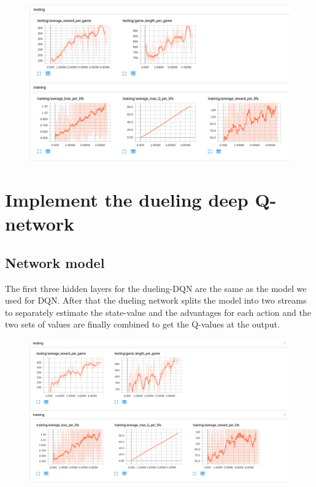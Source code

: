 \documentclass{article}
\begin{document}
\begin{figure}[h]
\centering
\includegraphics[scale=0.3]{double.png}
\end{figure}

\section*{Implement the dueling deep Q-network}
\subsection*{Network model}
The first three hidden layers for the dueling-DQN are the same as the model we used for DQN. After that the dueling network splits the model into two streams to separately estimate the state-value and the advantages for each action and the two sets of values are finally combined to get the Q-values at the output.

\begin{figure}[h]
\centering
\includegraphics[scale=0.3]{duel.png}
\end{figure}
\end{document}
